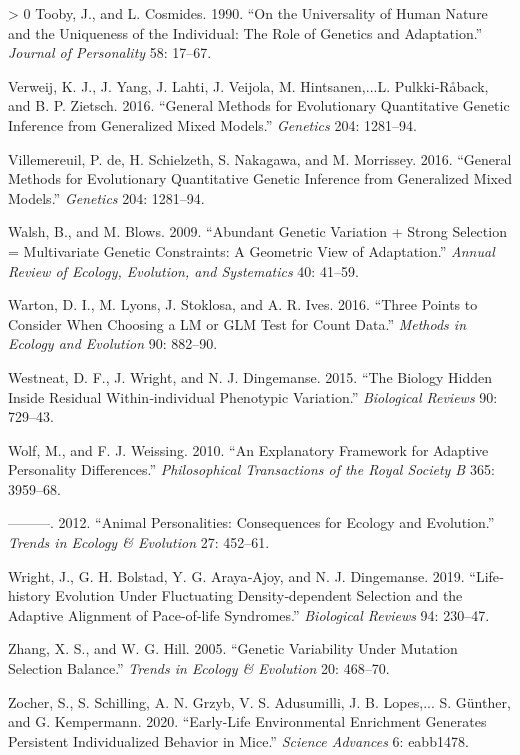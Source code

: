 \documentclass{article}
\newlength{\cslhangindent}
\newenvironment{CSLReferences}[3] %
 {%
  \setlength{\parindent}{0pt}
  \ifodd #1 \everypar{\setlength{\hangindent}{\cslhangindent}}\ignorespaces\fi
  \ifnum #2 > 0
  \setlength{\parskip}{#2\baselineskip}
  \fi
 }%
 {}
\begin{document}
\begin{CSLReferences}{1}{0}
\leavevmode\hypertarget{ref-Tooby1990}{}%
Tooby, J., and L. Cosmides. 1990. {``On the Universality of Human Nature
and the Uniqueness of the Individual: The Role of Genetics and
Adaptation.''} \emph{Journal of Personality} 58: 17--67.

\leavevmode\hypertarget{ref-Verw2012}{}%
Verweij, K. J., J. Yang, J. Lahti, J. Veijola, M. Hintsanen,...L.
Pulkki‐Råback, and B. P. Zietsch. 2016. {``General Methods for
Evolutionary Quantitative Genetic Inference from Generalized Mixed
Models.''} \emph{Genetics} 204: 1281--94.

\leavevmode\hypertarget{ref-Vill2016}{}%
Villemereuil, P. de, H. Schielzeth, S. Nakagawa, and M. Morrissey. 2016.
{``General Methods for Evolutionary Quantitative Genetic Inference from
Generalized Mixed Models.''} \emph{Genetics} 204: 1281--94.

\leavevmode\hypertarget{ref-Walsh2009}{}%
Walsh, B., and M. Blows. 2009. {``Abundant Genetic Variation + Strong
Selection = Multivariate Genetic Constraints: A Geometric View of
Adaptation.''} \emph{Annual Review of Ecology, Evolution, and
Systematics} 40: 41--59.

\leavevmode\hypertarget{ref-Warton2016}{}%
Warton, D. I., M. Lyons, J. Stoklosa, and A. R. Ives. 2016. {``Three
Points to Consider When Choosing a LM or GLM Test for Count Data.''}
\emph{Methods in Ecology and Evolution} 90: 882--90.

\leavevmode\hypertarget{ref-Westneat2015}{}%
Westneat, D. F., J. Wright, and N. J. Dingemanse. 2015. {``The Biology
Hidden Inside Residual Within‐individual Phenotypic Variation.''}
\emph{Biological Reviews} 90: 729--43.

\leavevmode\hypertarget{ref-Wolf2010}{}%
Wolf, M., and F. J. Weissing. 2010. {``An Explanatory Framework for
Adaptive Personality Differences.''} \emph{Philosophical Transactions of
the Royal Society B} 365: 3959--68.

\leavevmode\hypertarget{ref-Wolf2012}{}%
---------. 2012. {``Animal Personalities: Consequences for Ecology and
Evolution.''} \emph{Trends in Ecology \& Evolution} 27: 452--61.

\leavevmode\hypertarget{ref-Wright2019}{}%
Wright, J., G. H. Bolstad, Y. G. Araya‐Ajoy, and N. J. Dingemanse. 2019.
{``Life‐history Evolution Under Fluctuating Density‐dependent Selection
and the Adaptive Alignment of Pace‐of‐life Syndromes.''}
\emph{Biological Reviews} 94: 230--47.

\leavevmode\hypertarget{ref-Zhang2005}{}%
Zhang, X. S., and W. G. Hill. 2005. {``Genetic Variability Under
Mutation Selection Balance.''} \emph{Trends in Ecology \& Evolution} 20:
468--70.

\leavevmode\hypertarget{ref-Zocher2020}{}%
Zocher, S., S. Schilling, A. N. Grzyb, V. S. Adusumilli, J. B. Lopes,...
S. Günther, and G. Kempermann. 2020. {``Early-Life Environmental
Enrichment Generates Persistent Individualized Behavior in Mice.''}
\emph{Science Advances} 6: eabb1478.

\end{CSLReferences}



\end{document}

